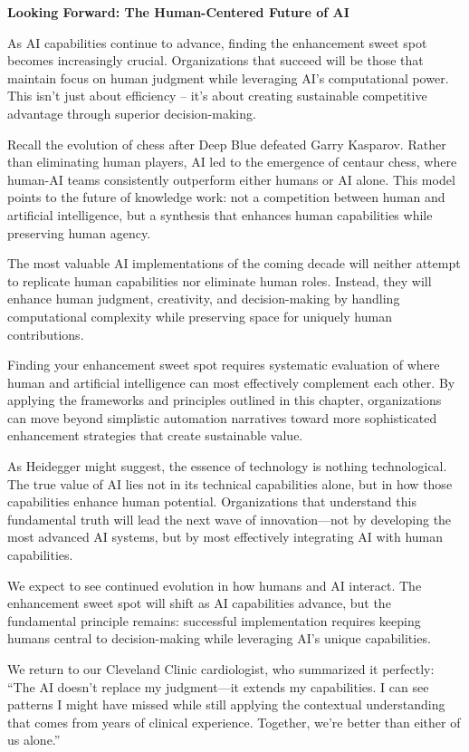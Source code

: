 \documentclass[
  Letterpaper,
]{scrbook}
\begin{document}
\textbf{Looking Forward: The Human-Centered Future of AI}

As AI capabilities continue to advance, finding the enhancement sweet
spot becomes increasingly crucial. Organizations that succeed will be
those that maintain focus on human judgment while leveraging AI's
computational power. This isn't just about efficiency -- it's about
creating sustainable competitive advantage through superior
decision-making.

Recall the evolution of chess after Deep Blue defeated Garry Kasparov.
Rather than eliminating human players, AI led to the emergence of
centaur chess, where human-AI teams consistently outperform either
humans or AI alone. This model points to the future of knowledge work:
not a competition between human and artificial
intelligence, but a synthesis
that enhances human capabilities while preserving human agency.

The most valuable AI implementations of the coming decade will neither
attempt to replicate human capabilities nor eliminate human roles.
Instead, they will enhance human judgment, creativity, and
decision-making by handling computational complexity while preserving
space for uniquely human contributions.

Finding your enhancement sweet spot requires systematic evaluation of
where human and artificial intelligence can most effectively complement
each other. By applying the frameworks and principles outlined in this
chapter, organizations can move beyond simplistic automation narratives
toward more sophisticated enhancement strategies that create sustainable
value.

As Heidegger might suggest, the essence of
technology is nothing technological. The true value of AI lies not in
its technical capabilities alone, but in how those capabilities enhance
human potential. Organizations that understand this fundamental truth
will lead the next wave of innovation---not by developing the most
advanced AI systems, but by most effectively integrating AI with human
capabilities.

We expect to see continued evolution in how humans and AI interact. The
enhancement sweet spot will shift as AI capabilities advance, but the
fundamental principle remains: successful implementation requires
keeping humans central to decision-making while leveraging AI's unique
capabilities.

We return to our Cleveland Clinic cardiologist, who summarized it
perfectly: ``The AI doesn't replace my judgment---it extends my
capabilities. I can see patterns I might have missed while still
applying the contextual understanding that comes from years of clinical
experience. Together, we're better than either of us alone.''
\end{document}
